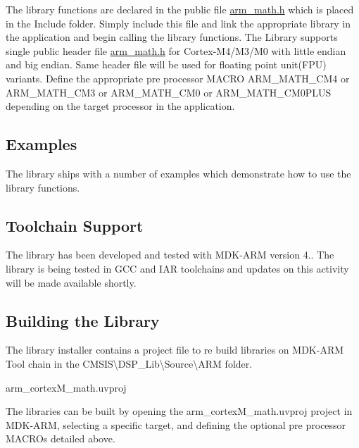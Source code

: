 The library functions are declared in the public file {\ttfamily \mbox{\hyperlink{arm__math_8h}{arm\+\_\+math.\+h}}} which is placed in the {\ttfamily Include} folder. Simply include this file and link the appropriate library in the application and begin calling the library functions. The Library supports single public header file {\ttfamily  \mbox{\hyperlink{arm__math_8h}{arm\+\_\+math.\+h}}} for Cortex-\/\+M4/\+M3/\+M0 with little endian and big endian. Same header file will be used for floating point unit(\+F\+P\+U) variants. Define the appropriate pre processor M\+A\+C\+RO A\+R\+M\+\_\+\+M\+A\+T\+H\+\_\+\+C\+M4 or A\+R\+M\+\_\+\+M\+A\+T\+H\+\_\+\+C\+M3 or A\+R\+M\+\_\+\+M\+A\+T\+H\+\_\+\+C\+M0 or A\+R\+M\+\_\+\+M\+A\+T\+H\+\_\+\+C\+M0\+P\+L\+US depending on the target processor in the application.

\subsection*{Examples }

The library ships with a number of examples which demonstrate how to use the library functions.

\subsection*{Toolchain Support }

The library has been developed and tested with M\+D\+K-\/\+A\+RM version 4.. The library is being tested in G\+CC and I\+AR toolchains and updates on this activity will be made available shortly.

\subsection*{Building the Library }

The library installer contains a project file to re build libraries on M\+D\+K-\/\+A\+RM Tool chain in the {\ttfamily C\+M\+S\+IS\textbackslash{}D\+S\+P\+\_\+\+Lib\textbackslash{}Source\textbackslash{}A\+RM} folder.
\begin{DoxyItemize}
\item arm\+\_\+cortex\+M\+\_\+math.\+uvproj
\end{DoxyItemize}

The libraries can be built by opening the arm\+\_\+cortex\+M\+\_\+math.\+uvproj project in M\+D\+K-\/\+A\+RM, selecting a specific target, and defining the optional pre processor M\+A\+C\+R\+Os detailed above.

